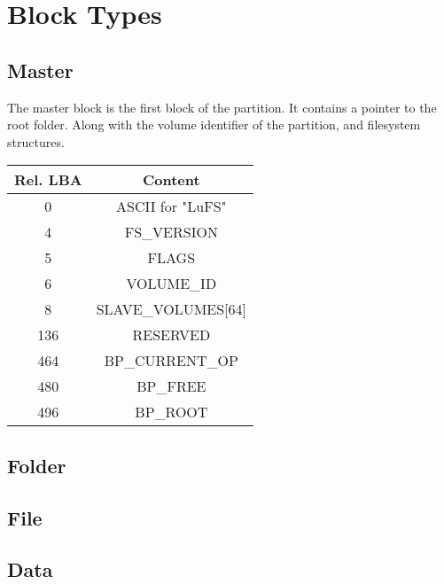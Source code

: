 \documentclass{article}
\begin{document}
\section{Block Types}
\subsection{Master}
The master block is the first block of the partition. It contains a pointer to the root folder. Along with the volume identifier of the partition, and filesystem structures.
\newline
\begin{tabular}{|c|c|}
  \hline
  Rel. LBA & Content \\
  \hline
  0 & ASCII for "LuFS"  \\
  \hline
  4 &  FS\_VERSION \\
  \hline
  5 &  FLAGS \\
  \hline
  6 &  VOLUME\_ID \\
  \hline
  8 &  SLAVE\_VOLUMES[64] \\
  \hline
  136 & RESERVED \\
  \hline
  464 & BP\_CURRENT\_OP \\
  \hline
  480 & BP\_FREE \\
  \hline
  496 & BP\_ROOT \\
  \hline
\end{tabular}
\subsection{Folder}
\subsection{File}
\subsection{Data}
\end{document}
